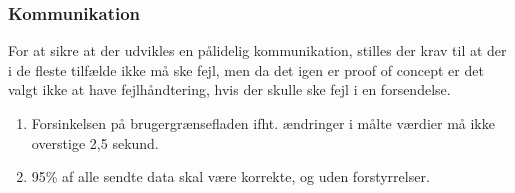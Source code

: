 \subsubsection{Kommunikation}
For at sikre at der udvikles en pålidelig kommunikation, stilles der krav til at der i de fleste tilfælde ikke må ske fejl, men da det igen er proof of concept er det valgt ikke at have fejlhåndtering, hvis der skulle ske fejl i en forsendelse.

\begin{enumerate}
	\item Forsinkelsen på brugergrænsefladen ifht. ændringer i målte værdier må ikke overstige 2,5 sekund. 
	\item 95\% af alle sendte data skal være korrekte, og uden forstyrrelser. 
\end{enumerate} 

